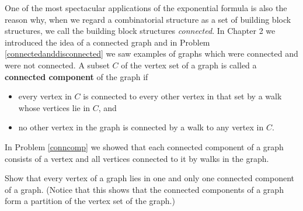 \ep





One of the most spectacular applications of the exponential formula
is also the reason why, when we regard a combinatorial structure as a set
of building block structures, we call the building block structures {\em
connected}.  In Chapter 2 we introduced the idea of a connected graph and
in Problem
\ref{connectedanddisconnected} we saw examples of graphs which were
connected and were not connected.  A subset $C$ of the vertex set of a
graph is called a {\bf connected component} of the graph if
\begin{itemize}
\item every vertex in $C$ is
connected to every other vertex in that set by a walk whose vertices lie
in $C$, and
\item no other vertex in the graph is connected by a walk to any vertex
in $C$.
\end{itemize}
In Problem \ref{conncomp} we showed that each connected component of a
graph consists of a vertex and all vertices connected to it by walks in
the graph.

\bp
\itemes Show that every vertex of a graph lies in one and only one
connected component of a graph.  (Notice that this shows that the
connected components of a graph form a partition of the vertex set of the
graph.)


